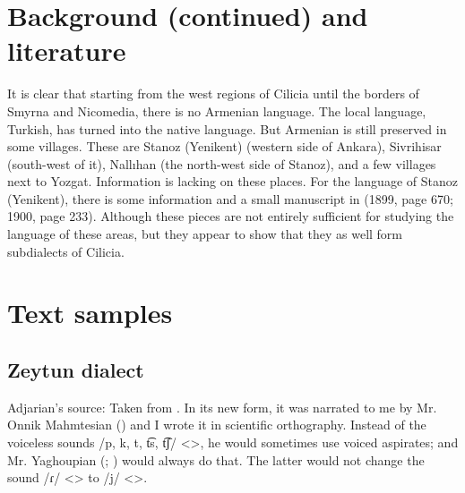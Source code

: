 \section{Background (continued) and literature}

It is clear that starting from the west regions of Cilicia until the borders of Smyrna and Nicomedia, there is no Armenian language. The local language, Turkish, has turned into the native language. But Armenian is still preserved in some villages. These are Stanoz (Yenikent) (western side of Ankara), Sivrihisar (south-west of it), Nallıhan (the north-west side of Stanoz), and a few villages next to Yozgat. Information is lacking on these places. For the language of Stanoz (Yenikent), there is some information and a small manuscript in  (1899, page 670; 1900, page 233). Although these pieces are not entirely sufficient for studying the language of these areas, but they appear to show that they as well form subdialects of Cilicia. 


\begin{adjarianpage}\label{page:206}\end{adjarianpage}%

\section{Text samples}

{\sampleoverview}

\subsection{Zeytun dialect}

Adjarian's source: Taken from \citet[159]{Allahverdian-1884-UlniaZeytun}. In its new form, it was narrated to me by Mr. Onnik Mahmtesian () and I wrote it in scientific orthography. Instead of the voiceless sounds /p, k, t, t͡s, t͡ʃ/ <>, he would sometimes use voiced aspirates; and Mr. Yaghoupian (; ) would always do that. The latter would not change the sound /ɾ/ <> to /j/ <>. 


